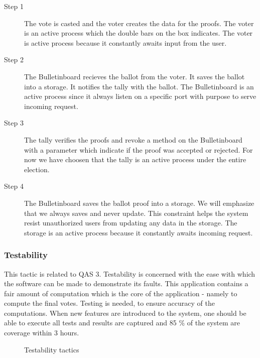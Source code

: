 \begin{description}
    \item[Step 1] The vote is casted and the voter creates the data for the proofs. The voter is an active process which the double bars on the box indicates. The voter is active process because it constantly awaits input from the user.  

    \item[Step 2] The Bulletinboard recieves the ballot from the voter. It saves the ballot into a storage. It notifies the tally with the ballot. The Bulletinboard is an active process since it always listen on a specific port with purpose to serve incoming request.   
    
    \item[Step 3] The tally verifies the proofs and revoke a method on the Bulletinboard with a parameter which indicate if the proof was accepted or rejected. For now we have choosen that the tally is an active process under the entire election. 
    
    \item[Step 4] The Bulletinboard saves the ballot proof into a storage. We will emphasize that we always saves and never update. This constraint helps the system resist unauthorized users from updating any data in the storage. The storage is an active process because it constantly awaits incoming request.  

\end{description}


\subsubsection{Testability}
This tactic is related to QAS 3. Testability is concerned with the ease with which the software can be made to demonstrate its faults. This application contains a fair amount of computation which is the core of the application - namely to compute the final votes. Testing is needed, to ensure accuracy of the computations. When new features are introduced to the system, one should be able to execute all tests and results are captured and 85 \% of the system are coverage within 3 hours.


\begin{figure}[H]
\centering
  \caption{Testability tactics \cite{Bass}}   
\end{figure}



